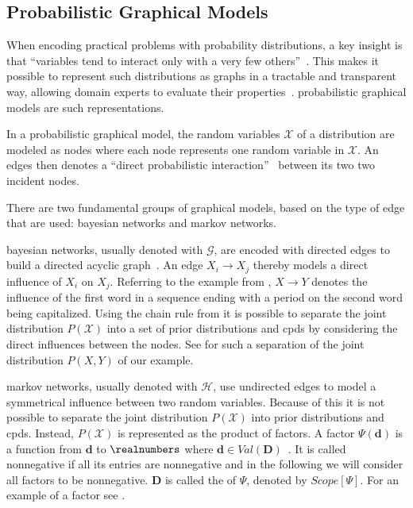 \subsection{Probabilistic Graphical Models}\label{subsec:graphical-models}
When encoding practical problems with \glspl{probability distribution}, a key insight is that ``variables tend to interact only with a very few others''~\citep{koller2009probabilistic}.
This makes it possible to represent such distributions as graphs in a tractable and transparent way, allowing domain experts to evaluate their properties~\citep{koller2009probabilistic}.
\Glspl{probabilistic graphical model} are such representations.

\bigskip

In a \gls{probabilistic graphical model}, the \glspl{random variable} $\mathcal{X}$ of a distribution are modeled as \glspl{node} where each \gls{node} represents one \gls{random variable} in $\mathcal{X}$. An \glspl{edge} then denotes a ``direct probabilistic interaction''~\citep{koller2009probabilistic} between its two two incident \glspl{node}.

There are two fundamental groups of graphical models, based on the type of edge that are used: \glspl{bayesian network} and \glspl{markov network}.

\bigskip

\Glspl{bayesian network}, usually denoted with $\mathcal{G}$, are encoded with directed \glspl{edge} to build a directed acyclic graph~\citep{koller2009probabilistic}.
An \gls{edge} $X_i\to X_j$ thereby models a direct influence of $X_i$ on $X_j$.
Referring to the example from , $X\to Y$ denotes the influence of the first word in a sequence ending with a period on the second word being capitalized.
Using the chain rule from  it is possible to separate the \gls{joint distribution} $P(\mathcal{X})$ into a set of \glspl{prior distribution} and \glspl{cpd} by considering the direct influences between the \glspl{node}.
See  for such a separation of the \gls{joint distribution} $P(X,Y)$ of our example.

\bigskip

\Glspl{markov network}, usually denoted with $\mathcal{H}$, use undirected \glspl{edge} to model a symmetrical influence between two \glspl{random variable}.
Because of this it is not possible to separate the \gls{joint distribution} $P(\mathcal{X})$ into \glspl{prior distribution} and \glspl{cpd}.
Instead, $P(\mathcal{X})$ is represented as the product of \glspl{factor}.
A \gls{factor} $\Psi(\mathbf{d})$ is a function from $\mathbf{d}$ to $\realnumbers$ where $\mathbf{d}\in Val(\mathbf{D})$~\citep{koller2009probabilistic}.
It is called nonnegative if all its entries are nonnegative and in the following we will consider all factors to be nonnegative.
$\mathbf{D}$ is called the  of $\Psi$, denoted by $Scope[\Psi]$.
For an example of a factor see .

